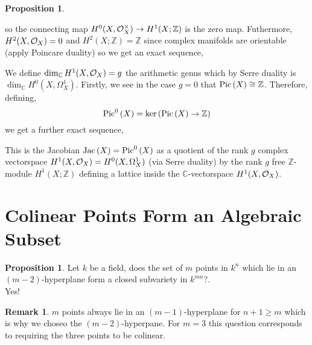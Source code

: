 \documentclass[12pt]{extarticle}
\newcommand{\Z}{\mathbb{Z}}
\theoremstyle{definition}
\newtheorem{proposition}[theorem]{Proposition}
\newtheorem{remark}{Remark}
\newcommand{\C}{\mathbb{C}}
\begin{document}
\begin{proposition}
\begin{center}
\end{center}
so the connecting map $H^0(X, \struct{X}^\times) \to H^1(X ; \Z)$ is the zero map. Futhermore, $H^2(X, \mathcal{O}_{X}) = 0$ and $H^2(X ; \Z) = \Z$ since complex manifolds are orientable (apply Poincare duality) so we get an exact sequence,
\begin{center}
\end{center}
We define $\dim_\C H^1(X, \struct{X}) = g$ the arithmetic genus which by Serre duality is $\dim_\C H^0(X, \Omega^1_X)$. Firstly, we see in the case $g = 0$ that $\Pic{X} \cong \Z$. Therefore, defining,
\[ \Piczero{X} = \ker{(\Pic{X} \to \Z)} \]
we get a further exact sequence,
\begin{center}
\end{center}
This is the Jacobian $\mathrm{Jac}\left( X \right) = \mathrm{Pic}^0\left( X \right)$ as a quotient of the rank $g$ complex vectorspace $H^1(X, \mathcal{O}_{X}) = H^0(X, \Omega^1_X)$ (via Serre duality) by the rank $g$ free $\Z$-module $H^1(X ; \Z)$ defining a lattice inside the $\C$-vectorspace $H^1(X, \mathcal{O}_{X})$. 
\end{proposition}


\section{Colinear Points Form an Algebraic Subset}


\begin{proposition}
Let $k$ be a field, does the set of $m$ points in $k^{n}$ which lie in an $(m-2)$-hyperplane form a closed subvariety in $k^{mn}$?.
\bigskip\\
Yes!
\end{proposition}

\begin{remark}
$m$ points always lie in an $(m-1)$-hyperplane for $n + 1 \ge m$ which is why we choseo the $(m-2)$-hyperpane. For $m = 3$ this question corresponds to requiring the three points to be colinear.  
\end{remark}
\end{document}

